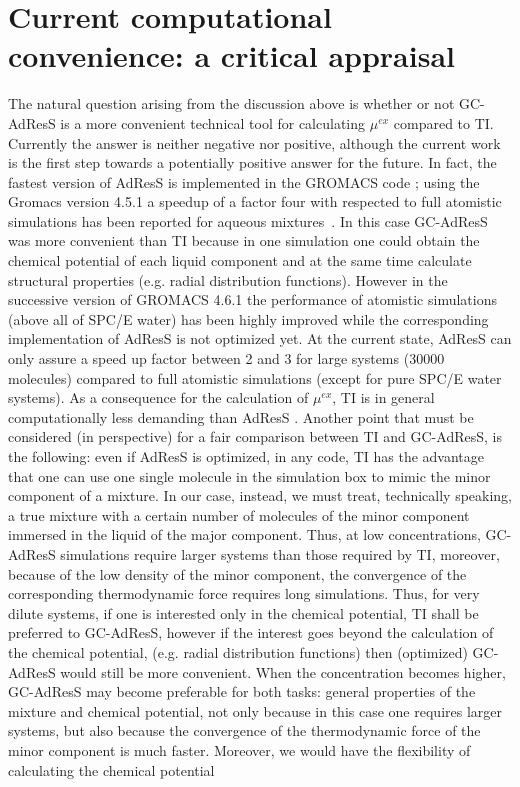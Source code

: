 \documentclass[a4paper,preprint,unsortedaddress]{revtex4-1}
\begin{document}
\section{Current computational convenience: a critical appraisal}
The natural question arising from the discussion above is whether or not GC-AdResS is a more convenient technical tool for calculating $\mu^{ex}$ compared to TI.
Currently the answer is {neither negative nor positive}, although the current work is the first step towards a potentially positive answer for the future. In fact, the fastest version of AdResS is implemented in the GROMACS code \cite{gromacs}; using the Gromacs version 4.5.1 a speedup of a factor four with respected to full atomistic simulations has been reported for aqueous mixtures~\cite{debashish1,nico-debashish}. In this case GC-AdResS was more convenient than TI because in one simulation one could obtain the chemical potential of each liquid component and at the same time calculate structural properties (e.g. radial distribution functions). However in the successive version of GROMACS 4.6.1 the performance of atomistic simulations (above all of SPC/E water) has been highly improved while the corresponding implementation of AdResS is not optimized yet. At the current state, AdResS can only assure a speed up factor between {2 and 3} for large systems (30000 molecules) compared to full atomistic simulations {(except for pure SPC/E water systems)}. As a consequence for the calculation of $\mu^{ex}$, TI is in general computationally less demanding than AdResS . Another point that must be considered (in perspective) for a fair comparison between TI and GC-AdResS, is the following: even if AdResS is optimized, in any code, TI has the advantage that one can use one single molecule in the simulation box to mimic the minor component of a mixture. In our case, instead, we must treat, technically speaking, a true mixture with a certain number of molecules of the minor component immersed in the liquid of the major component. Thus, at low concentrations, GC-AdResS simulations require larger systems than those required by TI, moreover, because of the low density of the minor component, the convergence of the corresponding thermodynamic force requires long simulations. 
Thus, for very dilute systems, if one is interested only in the chemical potential, TI shall be preferred to GC-AdResS, however if the interest goes beyond the calculation of the chemical potential, (e.g. radial distribution functions) then (optimized) GC-AdResS would still be more convenient.
When the concentration becomes higher, GC-AdResS may become preferable for both tasks: general properties of the mixture and chemical potential, not only because in this case one requires larger systems, but also because the convergence of the thermodynamic force of the minor component is much faster. Moreover, we would have the flexibility of calculating the chemical potential
\end{document}
